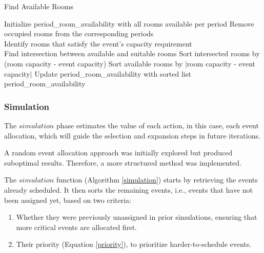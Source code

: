 \begin{algorithm}
\caption{Find Available Rooms}\label{find_available_rooms}
\begin{algorithmic}[1]
    \State Initialize period\_room\_availability with all rooms available per period
        \State Remove occupied rooms from the corresponding periods
    \EndFor
\\
    \State Identify rooms that satisfy the event's capacity requirement
\\
            \State Find intersection between available and suitable rooms
                \State Sort intersected rooms by (room capacity - event capacity)
            \Else
                \State Sort available rooms by $|$room capacity - event capacity$|$
            \EndIf
            \State Update period\_room\_availability with sorted list
        \EndIf
    \EndFor
\\
    \State \Return period\_room\_availability
\EndFunction
\end{algorithmic}
\end{algorithm}

\subsubsection{Simulation}

The \(simulation\) phase estimates the value of each action, in this case, each event allocation, which will guide the selection and expansion steps in future iterations. 

A random event allocation approach was initially explored but produced suboptimal results. Therefore, a more structured method was implemented.

The \(simulation\) function (Algorithm \ref{simulation}) starts by retrieving the events already scheduled. It then sorts the remaining events, i.e., events that have not been assigned yet, based on two criteria:
\begin{enumerate}
\item Whether they were previously unassigned in prior simulations, ensuring that more critical events are allocated first.
\item Their priority (Equation \ref{priority}), to prioritize harder-to-schedule events.
\end{enumerate}


